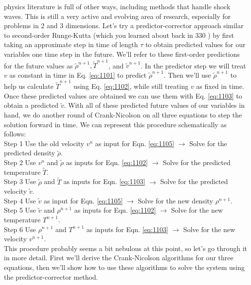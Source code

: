 physics literature is full of other ways, including methods that handle shock waves.
This is still a very active and evolving area of research, especially for problems in
2 and 3 dimensions.
Let\rq s try a predictor-corrector approach similar to second-order Runge-Kutta (which you learned about back in 330 ) by first taking an approximate step in time of length $\tau$ to obtain predicted values for our variables one time step in the future. We'll refer to these first-order predictions for the future values as $\tilde{\rho}^{n+1}, \tilde{T}^{n+1}$, and $\tilde{v}^{n+1}$. In the predictor step we will treat $v$ as constant in time in Eq. \eqref{eq:1101} to predict $\tilde{\rho}^{n+1}$. Then we'll use $\tilde{\rho}^{n+1}$ to help us calculate $\tilde{T}^{n+1}$ using Eq. \eqref{eq:1102}, while still treating $v$ as fixed in time. Once these predicted values are obtained we can use them with Eq. \eqref{eq:1103} to obtain a predicted $\tilde{v}$. With all of these predicted future values of our variables in hand, we do another round of Crank-Nicolson on all three equations to step the solution forward in time. We can represent this procedure schematically as follows:\\
Step 1 Use the old velocity $v^{n}$ as input for Eqn. \eqref{eq:1105} $\rightarrow$ Solve for the predicted density $\tilde{\rho}$.\\
Step 2 Use $v^{n}$ and $\tilde{\rho}$ as inputs for Eqn. \eqref{eq:1102} $\rightarrow$ Solve for the predicted temperature $\tilde{T}$.\\
Step 3 Use $\tilde{\rho}$ and $\tilde{T}$ as inputs for Eqn. \eqref{eq:1103} $\rightarrow$ Solve for the predicted velocity $\tilde{v}$.\\
Step 4 Use $\tilde{v}$ as input for Eqn. \eqref{eq:1105} $\rightarrow$ Solve for the new density $\rho^{n+1}$.\\
Step 5 Use $\tilde{v}$ and $\rho^{n+1}$ as inputs for Eqn. \eqref{eq:1102} $\rightarrow$ Solve for the new temperature $T^{n+1}$.\\
Step 6 Use $\rho^{n+1}$ and $T^{n+1}$ as inputs for Eqn. \eqref{eq:1103} $\rightarrow$ Solve for the new velocity $v^{n+1}$.\\

This procedure probably seems a bit nebulous at this point, so let\rq s go through it in more detail. First we\rq ll derive the Crank-Nicolson algorithms for our three equations, then we\rq ll show how to use these algorithms to solve the system using the predictor-corrector method.


